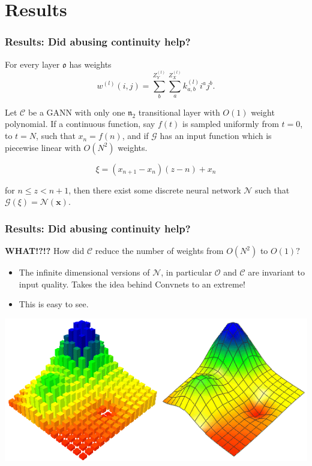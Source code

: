 \documentclass{beamer}
\begin{document}
\section{Results}

\begin{frame}
	\frametitle{Results: Did abusing continuity help?}	 
	For every layer $\mathfrak{o}$ has weights
	\begin{equation}
		w^{(l)}(i,j) = 
    \sum_{b}^{Z^{(l)}_Y} \sum_{a}^{Z^{(l)}_X} k^{(l)}_{a,b}i^{a}j^{b}.
	\end{equation}


	\begin{theorem}
  Let $\mathcal{C}$ be a GANN with only one $\mathfrak{n}_2$ transitional layer with $O(1)$ weight polynomial. If a continuous function, say $f(t)$ is sampled uniformly from $t = 0$, to $t = N$, such that $x_n = f(n)$, and if $\mathcal{G}$ has an input function which is piecewise linear with  $O(N^2)$ weights.

  \begin{equation}
  \xi = \left(x_{n+1} - x_n\right)\left(z - n\right) + x_n
  \end{equation}

  for $n \leq z < n+1$, then there exist some discrete neural network $\mathcal{N}$ such that $\mathcal{G}(\xi) = \mathcal{N}(\pmb{x}).$
\end{theorem}
\end{frame}

\begin{frame}
	\frametitle{Results: Did abusing continuity help?}
	\textbf{WHAT!?!?} How did $\mathcal{C}$ reduce the number of weights from $O(N^2)$ to $O(1)?$
	\begin{itemize}
	 	\item The infinite dimensional versions of $\mathcal{N}$, in particular $\mathcal{O}$ and $\mathcal{C}$ are invariant to input quality. Takes the idea behind Convnets to an extreme!
	 	\item This is easy to see.
	 \end{itemize} 

	 	\includegraphics{gc082_1.png}
\end{frame}
\end{document}
